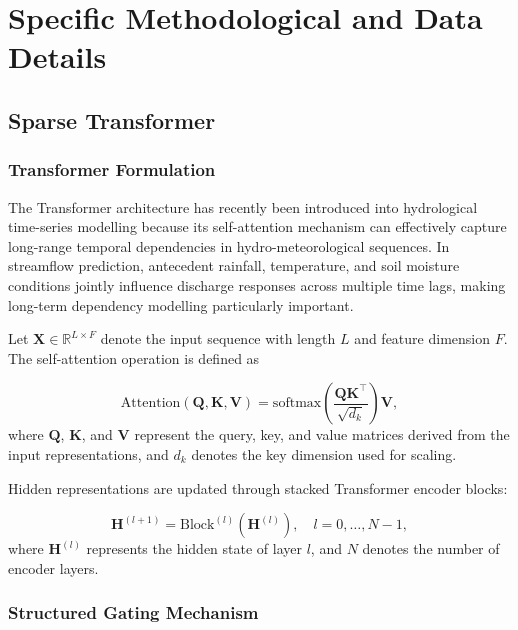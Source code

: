 \documentclass[11pt]{article}
\begin{document}
\section{Specific Methodological and Data Details}
\label{sec:method}
\subsection{Sparse Transformer}
\subsubsection{Transformer Formulation}

The Transformer architecture has recently been introduced into hydrological time-series modelling because its self-attention mechanism can effectively capture long-range temporal dependencies in hydro-meteorological sequences\cite{LIU2024131389}. In streamflow prediction, antecedent rainfall, temperature, and soil moisture conditions jointly influence discharge responses across multiple time lags, making long-term dependency modelling particularly important\cite{li2024application}.

Let $\mathbf{X}\in\mathbb{R}^{L\times F}$ denote the input sequence with length $L$ and feature dimension $F$. The self-attention operation is defined as\cite{dumontet2026_Transformer_nc}

\begin{equation}
    \mathrm{Attention}(\mathbf{Q},\mathbf{K},\mathbf{V})=
    \mathrm{softmax}\left(\frac{\mathbf{Q}\mathbf{K}^{\top}}{\sqrt{d_k}}\right)\mathbf{V},
\end{equation}
where $\mathbf{Q}$, $\mathbf{K}$, and $\mathbf{V}$ represent the query, key, and value matrices derived from the input representations, and $d_k$ denotes the key dimension used for scaling.

Hidden representations are updated through stacked Transformer encoder blocks\cite{AttentionIsAllYouNeed}:

\begin{equation}
    \mathbf{H}^{(l+1)}=\mathrm{Block}^{(l)}(\mathbf{H}^{(l)}), \quad l=0,\dots,N-1,
\end{equation}
where $\mathbf{H}^{(l)}$ represents the hidden state of layer $l$, and $N$ denotes the number of encoder layers.

\subsubsection{Structured Gating Mechanism}
\end{document}
